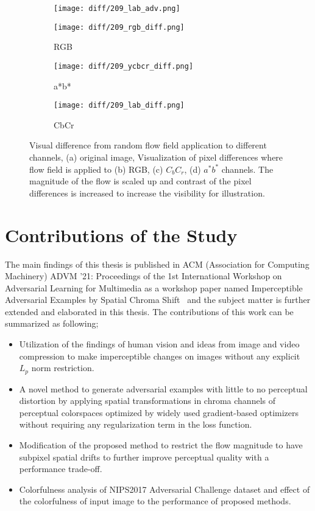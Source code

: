 \begin{figure}[t]
    \centering
    \begin{subfigure}[b]{.4\linewidth}
        \texttt{[image: diff/209\_lab\_adv.png]}
        \caption{}
    \end{subfigure}
    \begin{subfigure}[b]{.4\linewidth}
        \texttt{[image: diff/209\_rgb\_diff.png]}
        \caption{RGB}
    \end{subfigure}
    \begin{subfigure}[b]{.4\linewidth}
        \texttt{[image: diff/209\_ycbcr\_diff.png]}
        \caption{a*b*}
    \end{subfigure}
    \begin{subfigure}[b]{.4\linewidth}
        \texttt{[image: diff/209\_lab\_diff.png]}
        \caption{CbCr}
    \end{subfigure}
    \caption[Visual difference from random flow field application to different channels.]{ Visual difference from random flow field application to different channels, (a) original image, Visualization of pixel differences where flow field is applied to (b) RGB, (c) \(C_{b}C_{r}\), (d) \(a^*b^*\) channels. The magnitude of the flow is scaled up and contrast of the pixel differences is increased to increase the visibility for illustration. }\label{fig:diff}
\end{figure}


\section{Contributions of the Study}

The main findings of this thesis is published in ACM (Association for Computing Machinery) ADVM '21: Proceedings of the 1st International Workshop on Adversarial Learning for Multimedia as a workshop paper named Imperceptible Adversarial Examples by Spatial Chroma Shift~\cite{aydin2019imperceptible} and the subject matter is further extended and elaborated in this thesis. The contributions of this work can be summarized as following;

\begin{itemize}
    \item Utilization of the findings of human vision and ideas from image and video compression to make imperceptible changes on images without any explicit \(L_p\) norm restriction.
    \item A novel method to generate adversarial examples with little to no perceptual distortion by applying spatial transformations in chroma channels of perceptual colorspaces optimized by widely used gradient-based optimizers without requiring any regularization term in the loss function.
    \item Modification of the proposed method to restrict the flow magnitude to have subpixel spatial drifts to further improve perceptual quality with a performance trade-off.
    \item Colorfulness analysis of NIPS2017 Adversarial Challenge dataset and effect of the colorfulness of input image to the performance of proposed methods.
\end{itemize}


